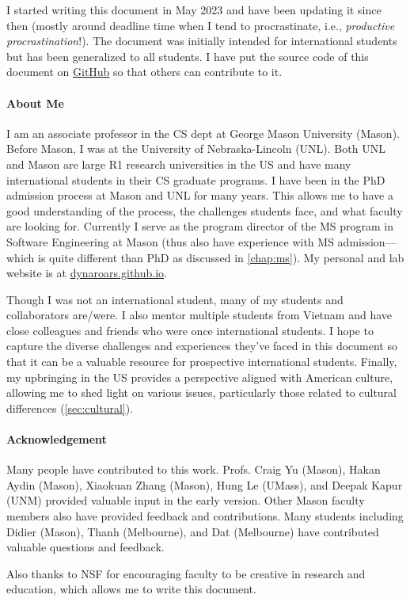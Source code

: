 \documentclass[oneside,11pt,dvipsnames]{book}
\begin{document}
I started writing this document in May 2023 and have been updating it since then (mostly around deadline time when I tend to procrastinate, i.e., \emph{productive procrastination}!). The document was initially intended for international students but has been generalized to all students.
I have put the source code of this document on \href{https://github.com/nguyenthanhvuh/phd-cs-us}{GitHub} so that others can contribute to it.

\paragraph{About Me} I am an associate professor in the CS dept at George Mason University (Mason). Before Mason, I was at the University of Nebraska-Lincoln (UNL). Both UNL and Mason are large R1 research universities in the US and have many international students in their CS graduate programs.
I have been in the PhD admission process at Mason and UNL for many years. This allows me to have a good understanding of the process, the challenges students face, and what faculty are looking for. Currently I serve as the program director of the MS program in Software Engineering at Mason (thus also have experience with MS admission---which is quite different than PhD as discussed in \autoref{chap:ms}). My personal and lab website is at \href{https://dynaroars.github.io}{dynaroars.github.io}.

Though I was not an international student, many of my students and collaborators are/were. I also mentor multiple students from Vietnam and have close colleagues and friends who were once international students. I hope to capture the diverse challenges and experiences they've faced in this document so that it can be a valuable resource for prospective international students.
Finally, my upbringing in the US provides a perspective aligned with American culture, allowing me to shed light on various issues, particularly those related to cultural differences (\autoref{sec:cultural}).




\paragraph{Acknowledgement} Many people have contributed to this work.
Profs. Craig Yu (Mason), Hakan Aydin (Mason), 
Xiaokuan Zhang (Mason), Hung Le (UMass), and Deepak Kapur (UNM) provided valuable input in the early version. Other Mason faculty members also have provided feedback and contributions.  Many students including Didier (Mason), Thanh (Melbourne), and Dat (Melbourne) have contributed valuable questions and feedback. 

Also thanks to NSF for encouraging faculty to be creative in research and education, which allows me to write this document. 



%
%
\end{document}
